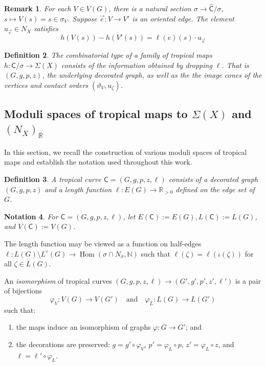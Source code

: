 \documentclass{article}
\newtheorem{definition}{Definition}[section]
\newtheorem{remark}[definition]{Remark}
\newtheorem{notation}[definition]{Notation}
\newcommand{\tropC}{\mathsf{C}}
\begin{document}
    \begin{remark}
        For each $V \in V(G)$, there is a natural section $\sigma \rightarrow \hat{\tropC}/\sigma$, $s \mapsto V(s) = s \in \sigma_V$. Suppose $\vec{e}: V \to V'$ is an oriented edge. The element $u_{\vec{e}} \in N_X$ satisfies 
        $$h(V(s)) - h(V'(s)) = \ell(e)(s) \cdot u_{\vec{e}}$$
    \end{remark}

    \begin{definition}\cite[Definition 2.23]{ACGSI}
        The combinatorial type of a family of tropical maps $h: \tropC/\sigma \rightarrow \Sigma(X)$ consists of the information obtained by dropping $\ell$. That is $(G, g, p, z)$, the underlying decorated graph, as well as the the image cones of the vertices and contact orders $(\vartheta_V, u_{\zeta})$.
    \end{definition}
    
    
    \subsection{Moduli spaces of tropical maps to $\Sigma(X)$ and $(N_X)_{\mathbb{R}}$}\label{sec: trop maps}

    In this section, we recall the construction of various moduli spaces of tropical maps and establish the notation used throughout this work. 

\begin{definition}
    \cite[Definition 2.2.1]{RSWII}
    A tropical curve $\tropC = (G, g, p, z, \ell)$ consists of a decorated graph $(G, g, p, z)$ and a \emph{length function} $\ell: E(G) \rightarrow \mathbb{R}_{>0}$ defined on the edge set of $G$. 
\end{definition}

    \begin{notation}
        For $\tropC = (G, g, p, z, \ell)$, let $E(\tropC) := E(G), L(\tropC) := L(G)$, and $V(\tropC) := V(G)$. 
    \end{notation}

The length function may be viewed as a function on half-edges $\ell: L(G) \setminus L^e(G) \rightarrow \operatorname{Hom}(\sigma \cap N_{\sigma}, \mathbb{N})$ such that $\ell(\zeta) = \ell(\iota(\zeta))$ for all $\zeta \in L(G)$. 

An \emph{isomorphism} of tropical curves $(G, g, p, z, \ell) \rightarrow (G', g', p', z', \ell')$ is a pair of bijections 
$$ \varphi_V: V(G) \rightarrow V(G') \quad \text{and} \quad \varphi_L: L(G) \rightarrow L(G') $$
such that:
\begin{enumerate}
    \item the maps induce an isomorphism of graphs $\varphi: G \rightarrow G'$; and 
    \item the decorations are preserved: $g = g' \circ \varphi_V$, $p' = \varphi_L \circ p$, $z' = \varphi_L \circ z$, and $\ell = \ell' \circ \varphi_L$. 
\end{enumerate}
\end{document}
